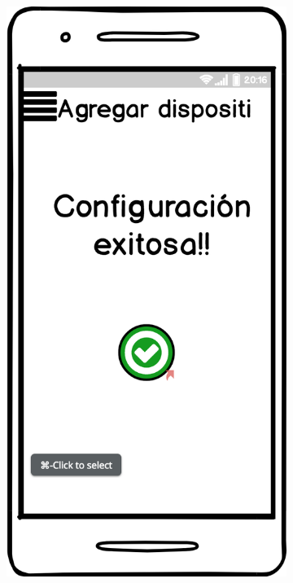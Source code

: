 \begin{figure}[H]
\begin{subfigure}[b]{0.20\textwidth}
    \label{fig:balsamiq}
  \end{subfigure}
  \begin{subfigure}[b]{0.20\textwidth}
    \includegraphics[width=\textwidth, keepaspectratio]{images/balsamiq03}

\end{subfigure}
\end{figure}
